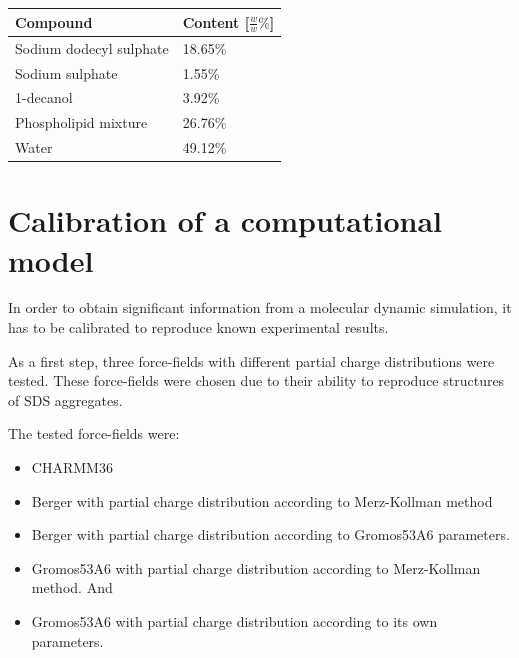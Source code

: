 \documentclass[twoside,twocolumn,9pt]{article}
\begin{document}
\begin{table}[h]
\small
  \caption{\ }
  \label{tab:mimetic_composition}
  \begin{tabular*}{0.48\textwidth}{@{\extracolsep{\fill}}ll}
    \hline
    Compound & Content [$\tfrac{w}{w}\%$] \\
    \hline
    Sodium dodecyl sulphate &  18.65\% \\
    Sodium sulphate & 1.55\%  \\
    1-decanol & 3.92\%  \\
    Phospholipid mixture & 26.76\%  \\
    Water & 49.12\% \\
    \hline
  \end{tabular*}
\end{table}

\section{Calibration of a computational model}
\label{sec:calib}

In order to obtain significant information from a molecular dynamic simulation,
it has to be calibrated to reproduce known experimental results. \par As a first
step, three force-fields with different partial charge distributions were
tested. These force-fields were chosen due to their ability to reproduce
structures of SDS aggregates\cite{Tang2014}.\par
The tested force-fields were:
\begin{itemize}
\item CHARMM36\cite{Vanommeslaeghe2009}
\item Berger\cite{Berger1997} with partial charge distribution according to Merz-Kollman
  method\cite{Besler1990}
\item Berger with partial charge distribution according to Gromos53A6\cite{Oostenbrink2004}
  parameters.
\item Gromos53A6 with partial charge distribution according to Merz-Kollman
  method. And
\item Gromos53A6 with partial charge distribution according to its own parameters.
\end{itemize}
\end{document}
